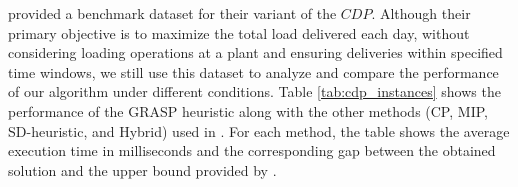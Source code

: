 \documentclass{article}
\begin{document}
\cite{kinable2014concrete} provided a benchmark dataset for their variant of the $CDP$. Although their primary objective is to maximize the total load delivered each day, without considering loading operations at a plant and ensuring deliveries within specified time windows, we still use this dataset to analyze and compare the performance of our algorithm under different conditions. Table \ref*{tab:cdp_instances} shows the performance of the GRASP heuristic along with the other methods (CP, MIP, SD-heuristic, and Hybrid) used in \cite{kinable2014concrete}.  For each method, the table shows the average execution time in milliseconds and the corresponding gap between the obtained solution and the upper bound provided by \cite{kinable2014concrete}.

\begin{table}[htbp]
    \centering
    \caption{Performance of the GRASP heuristic on the CDP benchmark instances}
    \label{tab:cdp_instances}
    \scriptsize
\end{table}
\end{document}
